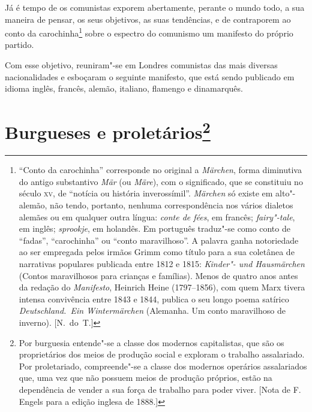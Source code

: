 Já é tempo de os comunistas exporem abertamente, perante o mundo
todo, a sua maneira de pensar, os seus objetivos, as suas tendências, e
de contraporem ao conto da carochinha\footnote{ “Conto da carochinha” corresponde no original a \textit{Märchen}, forma
diminutiva do antigo substantivo \textit{Mär} (ou \textit{Märe}), com o
significado, que se constituiu no século \textsc{xv}, de “notícia ou história
inverossímil”. \textit{Märchen} só existe em alto"-alemão, não tendo,
portanto, nenhuma correspondência  nos vários dialetos alemães ou em
qualquer outra língua: \textit{conte de fées}, em francês;
\textit{fairy"-tale}, em inglês; \textit{sprookje}, em holandês. Em
português traduz"-se como conto de “fadas”, “carochinha” ou “conto
maravilhoso”. A palavra ganha notoriedade ao ser empregada pelos irmãos
Grimm como título para a sua coletânea de narrativas populares
publicada entre 1812 e 1815: \textit{Kinder"- und Hausmärchen}
(Contos maravilhosos para crianças e famílias). Menos de quatro     \label{7}
anos antes da redação do \textit{Manifesto}, Heinrich Heine (1797--1856), com quem Marx tivera intensa convivência entre 1843 e 1844,
publica o seu longo poema satírico \textit{Deutschland.~Ein
Wintermärchen} (Alemanha. Um conto maravilhoso de inverno). [N.~do~T.]}
sobre o espectro do comunismo um manifesto do próprio partido.

Com esse objetivo, reuniram"-se em Londres comunistas das mais diversas	
nacionalidades e esboçaram o seguinte manifesto, que está sendo
publicado em idioma inglês, francês, alemão, italiano, flamengo e
dinamarquês.

\section{Burgueses e proletários\protect\footnote{\MakeUppercase{P}or
burguesia entende"-se a classe dos modernos capitalistas, que são os
proprietários dos meios de produção social e exploram o trabalho
assalariado. \MakeUppercase{P}or proletariado, compreende"-se a classe dos modernos
operários assalariados que, uma vez que não possuem meios de produção
próprios, estão na dependência de vender a sua força de trabalho para
poder viver. [\MakeUppercase{N}ota de \MakeUppercase{F.\,E}ngels para a edição inglesa de 1888.]}}


